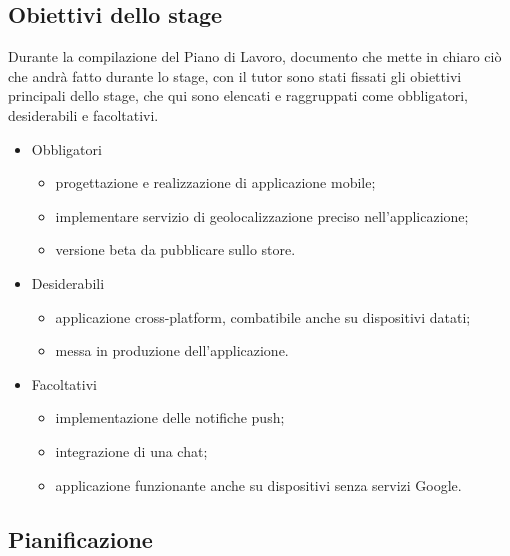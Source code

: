 \subsection{Obiettivi dello stage}
\label{sec:obiettivi}

Durante la compilazione del Piano di Lavoro, documento che mette in chiaro ciò che andrà fatto durante lo stage, con il tutor sono stati fissati gli obiettivi principali dello stage, che qui sono elencati e raggruppati come obbligatori, desiderabili e facoltativi.

\begin{itemize}
	\item Obbligatori
	\begin{itemize}
		\item progettazione e realizzazione di applicazione mobile;
    \item implementare servizio di geolocalizzazione preciso nell’applicazione;
    \item versione beta da pubblicare sullo store.
	\end{itemize}

	\item Desiderabili
	\begin{itemize}
		\item applicazione cross-platform, combatibile anche su dispositivi datati;
    \item messa in produzione dell’applicazione.
	\end{itemize}

	\item Facoltativi
	\begin{itemize}
		\item implementazione delle notifiche push;
    \item integrazione di una chat;
    \item applicazione funzionante anche su dispositivi senza servizi Google.
	\end{itemize}
\end{itemize}

\subsection{Pianificazione}

